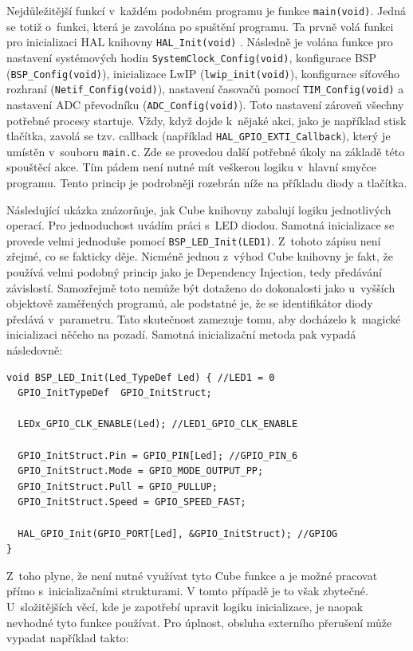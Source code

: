 Nejdůležitější funkcí v~každém podobném programu je funkce \texttt{main(void)}. Jedná se totiž o~funkci, která je zavolána po spuštění programu. Ta prvně volá funkci pro inicializaci HAL knihovny \texttt{HAL\_Init(void)} \cite{hal}. Následně je volána funkce pro nastavení systémových hodin \texttt{SystemClock\_Config(void)}, konfigurace BSP (\texttt{BSP\_Config(void)}), inicializace LwIP  (\texttt{lwip\_init(void)}), konfigurace síťového rozhraní (\texttt{Netif\_Config(void)}), nastavení časovačů pomocí \texttt{TIM\_Config(void)} a nastavení ADC převodníku (\texttt{ADC\_Config(void)}). Toto nastavení zároveň všechny potřebné procesy startuje. Vždy, když dojde k~nějaké akci, jako je například stisk tlačítka, zavolá se tzv. callback (například \texttt{HAL\_GPIO\_EXTI\_Callback}), který je umístěn v~souboru \texttt{main.c}. Zde se provedou další potřebné úkoly na základě této spouštěcí akce. Tím pádem není nutné mít veškerou logiku v~hlavní smyčce programu. Tento princip je podrobněji rozebrán níže na příkladu diody a tlačítka.

Následující ukázka znázorňuje, jak Cube knihovny  zabalují logiku jednotlivých operací. Pro jednoduchost uvádím práci s~LED diodou. Samotná inicializace se provede velmi jednoduše pomocí \texttt{BSP\_LED\_Init(LED1)}. Z~tohoto zápisu není zřejmé, co se fakticky děje. Nicméně jednou z~výhod Cube knihovny je fakt, že používá velmi podobný princip jako je Dependency Injection, tedy předávání závislostí. Samozřejmě toto nemůže být dotaženo do dokonalosti jako u~vyšších objektově zaměřených programů, ale podstatné je, že se identifikátor diody předává v~parametru. Tato skutečnost zamezuje tomu, aby docházelo k~magické inicializaci něčeho na pozadí. Samotná inicializační metoda pak vypadá následovně:

\begin{verbatim}
void BSP_LED_Init(Led_TypeDef Led) { //LED1 = 0
  GPIO_InitTypeDef  GPIO_InitStruct;

  LEDx_GPIO_CLK_ENABLE(Led); //LED1_GPIO_CLK_ENABLE

  GPIO_InitStruct.Pin = GPIO_PIN[Led]; //GPIO_PIN_6
  GPIO_InitStruct.Mode = GPIO_MODE_OUTPUT_PP;
  GPIO_InitStruct.Pull = GPIO_PULLUP;
  GPIO_InitStruct.Speed = GPIO_SPEED_FAST;
  
  HAL_GPIO_Init(GPIO_PORT[Led], &GPIO_InitStruct); //GPIOG
}
\end{verbatim}

Z~toho plyne, že není nutné využívat tyto Cube funkce a je možné pracovat přímo s~inicializačními strukturami. V tomto případě je to však zbytečné. U~složitějších věcí, kde je zapotřebí upravit logiku inicializace, je naopak nevhodné tyto funkce používat. Pro úplnost, obsluha externího přerušení může vypadat například takto:

